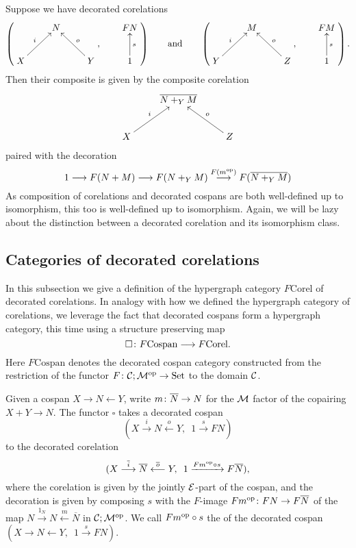 Suppose we have decorated corelations
\[
  \left(
  \begin{aligned}
    \xymatrix{
      & N \\  
      X \ar[ur]^{i} && Y \ar[ul]_{o}
    }
  \end{aligned}
  ,
  \qquad
  \begin{aligned}
    \xymatrix{
      FN \\
      1 \ar[u]_{s}
    }
  \end{aligned}
  \right)
  \qquad
  \mbox{and}
  \qquad
  \left(
  \begin{aligned}
    \xymatrix{
      & M \\  
      Y \ar[ur]^{i} && Z \ar[ul]_{o}
    }
  \end{aligned}
  ,
  \qquad
  \begin{aligned}
    \xymatrix{
      FM \\
      1 \ar[u]_{s}
    }
  \end{aligned}
  \right).
\]
Then their composite is given by the composite corelation
\[
  \xymatrix{
    & \overline{N+_YM} \\  
    X \ar[ur]^{i} && Z \ar[ul]_{o}
  }
\]
paired with the decoration
\[
  1 \longrightarrow F(N+M) \longrightarrow F(N+_YM) \stackrel{F(m^{\mathrm{op}})}\longrightarrow F(\overline{N+_YM})
\]
As composition of corelations and decorated cospans are both well-defined up to
isomorphism, this too is well-defined up to isomorphism. Again, we will be lazy
about the distinction between a decorated corelation and its isomorphism class.


\subsection{Categories of decorated corelations}
In this subsection we give a definition of the hypergraph category
$F\mathrm{Corel}$ of decorated corelations.  In analogy with how we defined the
hypergraph category of corelations, we leverage the fact that decorated cospans
form a hypergraph category, this time using a structure preserving map 
\[
  \square{\colon} F\mathrm{Cospan} \longrightarrow F\mathrm{Corel}.
\]
Here $F\mathrm{Cospan}$ denotes the decorated cospan category constructed from
the restriction of the functor $F{\colon} \mathcal C;\mathcal M^{\mathrm{op}} \to \mathrm{Set}$ to the domain
$\mathcal C$. 

Given a cospan $X \to N \leftarrow Y$, write $m{\colon} \overline{N} \to N$ for the
$\mathcal M$ factor of the copairing $X+Y \to N$. The functor $\square$ takes a
decorated cospan 
\[
  (X \stackrel{i}\longrightarrow N \stackrel{o}\longleftarrow Y, \enspace 1
    \stackrel{s}\longrightarrow FN)
\]
to the decorated corelation 
\[
  (X \stackrel{\overline{i}}\longrightarrow \overline N
  \stackrel{\overline{o}}{\longleftarrow} Y, \enspace 1 \xrightarrow{Fm^{\mathrm{op}} \circ
  s} F\overline{N}),
\]
where the corelation is given by the jointly $\mathcal E$-part of the cospan, and the
decoration is given by composing $s$ with the $F$-image $Fm^{\mathrm{op}}{\colon} FN \to
F\overline{N}$ of the map $N \stackrel{1_N}\to N \stackrel{m}\leftarrow
\overline{N}$ in $\mathcal C;\mathcal M^{\mathrm{op}}$. We call $Fm^{\mathrm{op}} \circ s$ the
 of the decorated cospan $(X \to N \leftarrow Y,
\enspace 1 \stackrel{s}\to FN)$.

